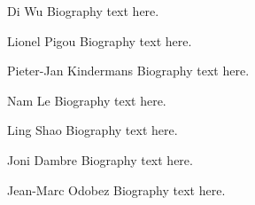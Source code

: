 

\begin{IEEEbiographynophoto}{Di Wu}
Biography text here.
\end{IEEEbiographynophoto}

\begin{IEEEbiographynophoto}{Lionel Pigou}
Biography text here.
\end{IEEEbiographynophoto}

\begin{IEEEbiographynophoto}{Pieter-Jan Kindermans}
Biography text here.
\end{IEEEbiographynophoto}


\begin{IEEEbiographynophoto}{ Nam Le}
Biography text here.
\end{IEEEbiographynophoto}


\begin{IEEEbiographynophoto}{Ling Shao}
Biography text here.
\end{IEEEbiographynophoto}


\begin{IEEEbiographynophoto}{ Joni Dambre}
Biography text here.
\end{IEEEbiographynophoto}


\begin{IEEEbiography}{Jean-Marc Odobez}
Biography text here.
\end{IEEEbiography}





\endinput
